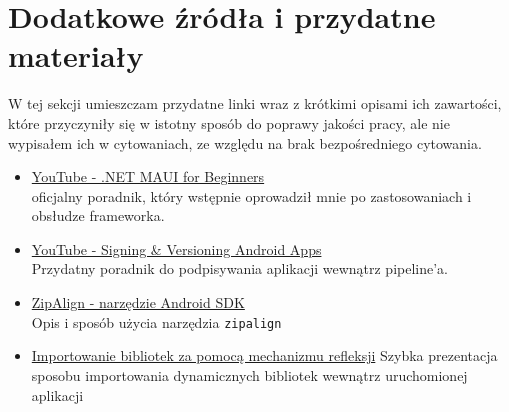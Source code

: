 \section{Dodatkowe źródła i przydatne materiały} \label{dodatkoweZrodla}
W tej sekcji umieszczam przydatne linki wraz z krótkimi opisami ich zawartości,
które przyczyniły się w istotny sposób do poprawy jakości pracy, ale nie wypisałem ich w cytowaniach,
ze względu na brak bezpośredniego cytowania.

\begin{itemize}
    \item \href{https://www.youtube.com/playlist?list=PLdo4fOcmZ0oUBAdL2NwBpDs32zwGqb9DY}{YouTube - .NET MAUI for Beginners} \\
        oficjalny poradnik, który wstępnie oprowadził mnie po zastosowaniach i obsłudze frameworka.
    \item \href{https://www.youtube.com/watch?v=s1grtSSIRVA}{YouTube - Signing \& Versioning Android Apps} \\
        Przydatny poradnik do podpisywania aplikacji wewnątrz pipeline'a.
    \item \href{https://developer.android.com/tools/zipalign}{ZipAlign - narzędzie Android SDK}\\%
        Opis i sposób użycia narzędzia \verb|zipalign|
    \item \href{https://learn.microsoft.com/en-us/dotnet/framework/reflection-and-codedom/how-to-load-assemblies-into-the-reflection-only-context}%
        {Importowanie bibliotek za pomocą mechanizmu refleksji}
        Szybka prezentacja sposobu importowania dynamicznych bibliotek wewnątrz uruchomionej aplikacji
\end{itemize}
